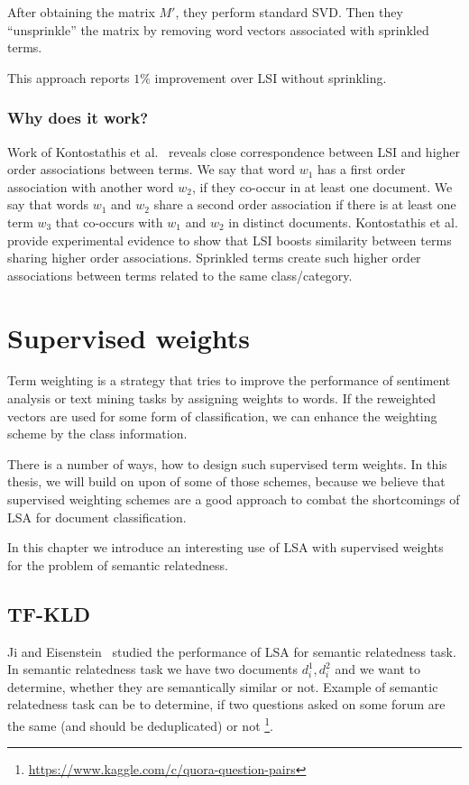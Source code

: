     After obtaining the matrix $M'$, they perform standard SVD. 
    Then they ``unsprinkle'' the matrix by removing word vectors associated with sprinkled terms.
    
    This approach reports $1\%$ improvement over LSI without sprinkling.
    
    \subsubsection{Why does it work?}
    Work of Kontostathis et al.~\cite{kontostathis2006framework} reveals close correspondence between LSI and higher order associations between terms. 
    We say that word $w_1$ has a first order association with another word $w_2$, if they co-occur in at least one document. 
    We say that words $w_1$ and $w_2$ share a second order association if there is at least one term $w_3$ that co-occurs with $w_1$ and $w_2$ in distinct documents. 
    Kontostathis et al. provide experimental evidence to show that LSI boosts similarity between terms sharing higher order associations. 
    Sprinkled terms create such higher order associations between terms related to  the same class/category.
        
\section{Supervised weights}
    
    Term weighting is a strategy that tries to improve the performance of sentiment analysis or text mining tasks by assigning weights to words.
    If the reweighted vectors are used for some form of classification,
    we can enhance the weighting scheme by the class information.
    
    There is a number of ways, how to design such supervised term weights.
    In this thesis, we will build on upon of some of those schemes,
    because we believe that supervised weighting schemes are a good approach to combat the shortcomings of LSA for document classification.
    
    In this chapter we introduce an interesting use of LSA with supervised weights for the problem of semantic relatedness.

    \subsection{TF-KLD}
        Ji and Eisenstein~\cite{ji2013discriminative} %
        studied the performance of LSA for semantic relatedness task.
        In semantic relatedness task we have two documents $d_i^1, d_i^2$ and we want to determine, whether they are semantically similar or not. 
        Example of semantic relatedness task can be to determine, if two questions asked on some forum are the same (and should be deduplicated) or not \footnote{\url{https://www.kaggle.com/c/quora-question-pairs}}.
        
